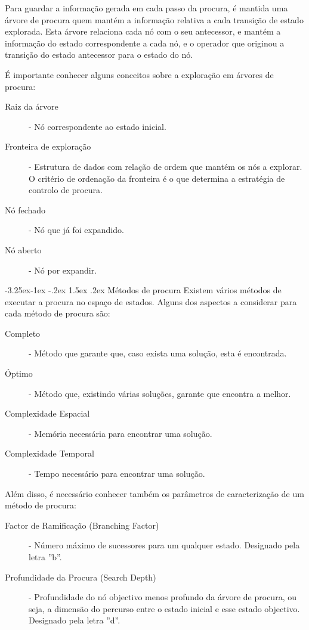 \documentclass[a4paper,12pt]{article}
\makeatletter
\renewcommand\paragraph{\@startsection{paragraph}{4}{\z@}%
                {-3.25ex\@plus -1ex \@minus -.2ex}%
                {1.5ex \@plus .2ex}%
                {\normalfont\normalsize\bfseries}}
\makeatother
\begin{document}
Para guardar a informação gerada em cada passo da procura, é mantida uma árvore de procura quem mantém a informação relativa a cada transição de estado explorada.
Esta árvore relaciona cada nó com o seu antecessor, e mantém a informação do estado correspondente a cada nó, e o operador que originou a transição do estado antecessor para o estado do nó.

É importante conhecer alguns conceitos sobre a exploração em árvores de procura:
\begin{description}
	\item[Raiz da árvore] - Nó correspondente ao estado inicial.
	\item[Fronteira de exploração] - Estrutura de dados com relação de ordem que mantém os nós a explorar. O critério de ordenação da fronteira é o que determina a estratégia de controlo de procura.
	\item[Nó fechado] - Nó que já foi expandido.
	\item[Nó aberto] - Nó por expandir.
\end{description}

\paragraph{Métodos de procura}
Existem vários métodos de executar a procura no espaço de estados. Alguns dos aspectos a considerar para cada método de procura são:

\begin{description}
	\item[Completo] - Método que garante que, caso exista uma solução, esta é encontrada.
	\item[Óptimo] - Método que, existindo várias soluções, garante que encontra a melhor.
	\item[Complexidade Espacial] - Memória necessária para encontrar uma solução.
	\item[Complexidade Temporal] - Tempo necessário para encontrar uma solução.
\end{description}

Além disso, é necessário conhecer também os parâmetros de caracterização de um método de procura:
\begin{description}
	\item[Factor de Ramificação (Branching Factor)] - Número máximo de sucessores para um qualquer estado. Designado pela letra ''b''.
	\item[Profundidade da Procura (Search Depth)] - Profundidade do nó objectivo menos profundo da árvore de procura, ou seja, a dimensão do percurso entre o estado inicial e esse estado objectivo. Designado pela letra ''d''.
\end{description}
\end{document}
